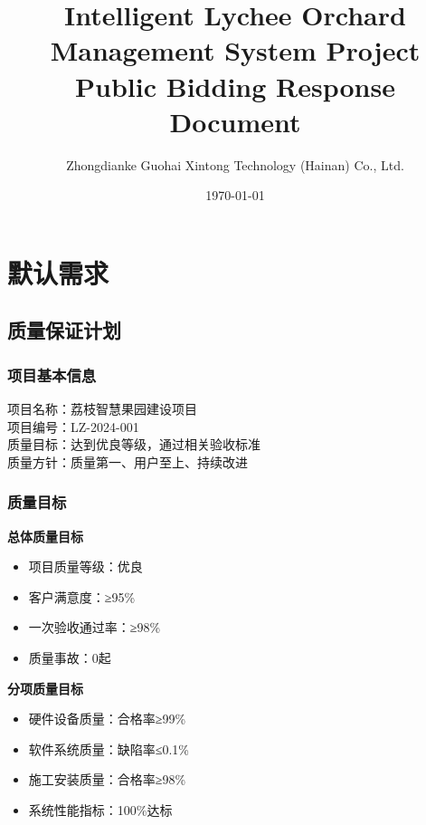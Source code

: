 \documentclass[UTF8,a4paper,12pt]{article}
\title{\textbf{Intelligent Lychee Orchard Management System Project\\Public Bidding Response Document}}
\author{Zhongdianke Guohai Xintong Technology (Hainan) Co., Ltd.}
\date{\today}
\begin{document}
\maketitle

\tableofcontents
\newpage

\section{默认需求}

\subsection{质量保证计划}

\subsubsection{项目基本信息}
项目名称：荔枝智慧果园建设项目 \\
项目编号：LZ-2024-001 \\
质量目标：达到优良等级，通过相关验收标准 \\
质量方针：质量第一、用户至上、持续改进

\subsubsection{质量目标}
\textbf{总体质量目标}
\begin{itemize}
    \item 项目质量等级：优良
    \item 客户满意度：≥95\%
    \item 一次验收通过率：≥98\%
    \item 质量事故：0起
\end{itemize}

\textbf{分项质量目标}
\begin{itemize}
    \item 硬件设备质量：合格率≥99\%
    \item 软件系统质量：缺陷率≤0.1\%
    \item 施工安装质量：合格率≥98\%
    \item 系统性能指标：100\%达标
\end{itemize}
\end{document}
